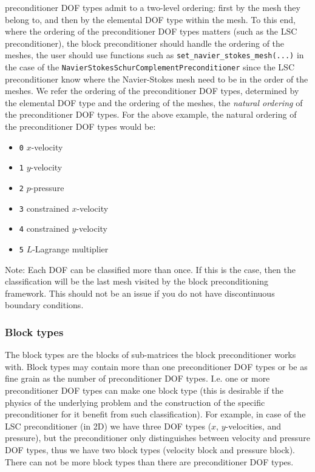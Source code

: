 preconditioner DOF types admit to a two-level ordering: first by the mesh 
they belong to, and then by the elemental DOF type within the mesh. To this end, 
where the ordering of the preconditioner DOF types matters (such as the 
LSC preconditioner), the block preconditioner should handle the ordering of the 
meshes, the user should use functions such as 
\texttt{set\_\allowbreak navier\_\allowbreak stokes\_\allowbreak mesh(...)}
in the case of the 
\texttt{Navier\allowbreak Stokes\allowbreak Schur\allowbreak Complement\allowbreak Preconditioner} 
since the LSC preconditioner know where the Navier-Stokes mesh need to be in 
the order of the meshes. We refer the ordering of the preconditioner DOF types, 
determined by the elemental DOF type and the ordering of the meshes, the 
\emph{natural ordering} of the preconditioner DOF types. For the above example, 
the natural ordering of the preconditioner DOF
types would be:
\begin{itemize}
 \item \texttt{0} $x$-velocity
 \item \texttt{1} $y$-velocity
 \item \texttt{2} $p$-pressure
 \item \texttt{3} constrained $x$-velocity
 \item \texttt{4} constrained $y$-velocity
 \item \texttt{5} $L$-Lagrange multiplier
\end{itemize}
Note: Each DOF can be classified more than once. If this is the case, then the 
classification will be the last mesh visited by the block preconditioning 
framework. This should not be an issue if you do not have discontinuous 
boundary conditions.

\subsubsection{Block types}
The block types are the blocks of sub-matrices the block preconditioner works 
with. Block types may contain more than one preconditioner DOF types or be as 
fine grain as the number of preconditioner DOF types. I.e. one or more 
preconditioner DOF types can make one block type (this is desirable if the 
physics of the underlying problem and the construction of the specific
preconditioner for it benefit from such classification). For example, in case 
of the LSC preconditioner (in 2D) we have three DOF types ($x$, $y$-velocities, 
and pressure), but the preconditioner only distinguishes between velocity and 
pressure DOF types, thus we have two block types (velocity block and pressure 
block). There can not be more block types than there are preconditioner DOF
types. 


